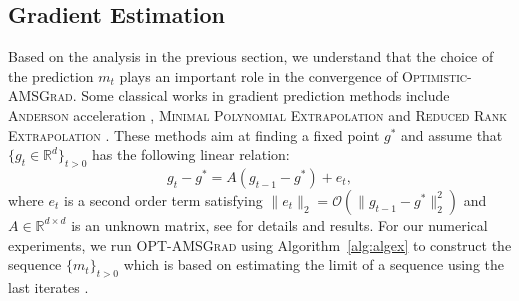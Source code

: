 \documentclass[wcp]{jmlr}
\begin{document}
%

\subsection{Gradient Estimation}

Based on the analysis in the previous section, we understand that the choice of the prediction $m_t$ plays an important role in the convergence of \textsc{Optimistic-AMSGrad}.
Some classical works in gradient prediction methods include \textsc{Anderson} acceleration \citep{WN11}, \textsc{Minimal Polynomial Extrapolation} \citep{CJ76} and  \textsc{Reduced Rank Extrapolation} \citep{E79}.
These methods aim at finding a fixed point $g^{*}$ and assume that $\{g_t \in \mathbb R^d\}_{t>0} $ has the following linear relation:
\begin{equation} \label{nox}
g_t - g^* = A( g_{t-1} - g^* ) + e_t,
\end{equation}
where $e_t$ is a second order term satisfying $\| e_t \|_2  = \mathcal{O}( \| g_{t-1} - g^* \|_2^2)$ and $A \in \mathbb R^{d \times d}$ is an unknown matrix, see \citep{SAB16} for details and results.
For our numerical experiments, we run \textsc{OPT-AMSGrad} using Algorithm~\ref{alg:algex} to construct the sequence $\{m_t\}_{t>0}$ which is based on estimating the limit of a sequence using the last iterates \citep{BZ13}.


\end{document}
